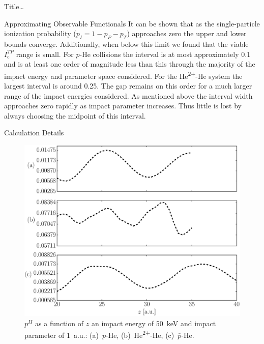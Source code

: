 \documentclass[letterpaper, 10 pt]{report}
\begin{document}
\begin{chapter}{ Title\dots \label{chap:p-he2p-he}}
\begin{section}{Approximating Observable Functionals \label{sec:phe2p-obs}}
      It can be shown that as the single-particle ionization probability ($p_I = 1 - p_P - p_T$)
      approaches zero the upper and lower bounds converge. Additionally, when below this limit we found
      that the viable $I_\mathrm{c}^{TP}$ range is small. For $p$-He collisions the interval is at most
      approximately 0.1 and is at least one order of magnitude less than this through the majority of the
      impact energy and parameter space considered. For the He\textsuperscript{2+}-He system the largest
      interval is around 0.25. The gap remains on this order for a much larger range of the impact
      energies considered. As mentioned above the interval width approaches zero rapidly as impact
      parameter increases. Thus little is lost by always choosing the midpoint of this interval.

   \end{section}

   \begin{section}{Calculation Details \label{sec:phe2p-det}}
      
      \begin{figure}[ht]
         \begin{minipage}{.49\linewidth}
            
            \centering
            \includegraphics[width = \linewidth]{./images/poz.eps}
            \caption[Probabilities as a function of nuclear separation.]{$p^{II}$ as a
                     function of $z$ an impact energy of 50~keV and impact parameter of 1~a.u.:
                     (a)~$p$-He, (b)~He\textsuperscript{2+}-He, (c)~$\bar{p}$-He. \label{fig:poz}}
         \end{minipage} \hspace{0.04\linewidth} %
         \begin{minipage}{.49\linewidth}
            

\end{minipage}
\end{figure}
\end{section}
\end{chapter}
\end{document}
